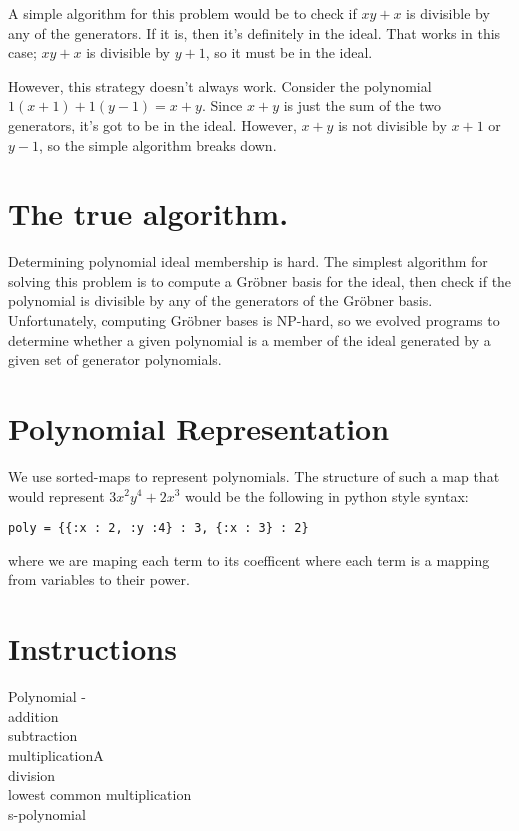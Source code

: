\documentclass[12pt]{article}
\begin{document}
    A simple algorithm for this problem would be to check if $xy+x$ is divisible by any of the generators.
    If it is, then it's definitely in the ideal.
    That works in this case; $xy + x$ is divisible by $y+1$, so it must be in the ideal.

    However, this strategy doesn't always work.
    Consider the polynomial $1(x+1) + 1(y-1) = x + y$.
    Since $x+y$ is just the sum of the two generators, it's got to be in the ideal.
    However, $x + y$ is not divisible by $x+1$ or $y-1$, so the simple algorithm breaks down.

\newpage
\section*{The true algorithm.}

    Determining polynomial ideal membership is hard.
    The simplest algorithm for solving this problem is to compute a Gr\"obner basis for the ideal, then check if the polynomial is divisible by any of the generators of the Gr\"obner basis.
    Unfortunately, computing Gr\"obner bases is NP-hard, so we evolved programs to determine whether a given polynomial is a member of the ideal generated by a given set of generator polynomials.


\newpage
\section*{Polynomial Representation}

We use sorted-maps to represent polynomials. The structure of such a map that would represent $3x^2y^4 + 2x^3$ would be the following in python style syntax:

\begin{verbatim}
poly = {{:x : 2, :y :4} : 3, {:x : 3} : 2}
\end{verbatim}

 where we are maping each term to its coefficent where each term is a mapping from variables to their power.


\section*{Instructions}

Polynomial - \\
\indent addition \\
\indent subtraction     \\   
\indent multiplicationA \\
\indent division \\
\indent lowest common multiplication \\
\indent s-polynomial \\
\end{document}
